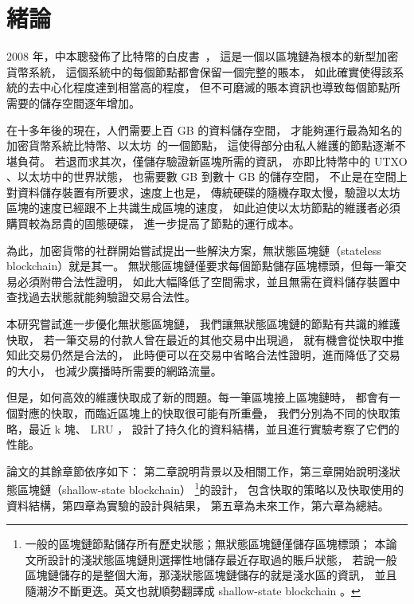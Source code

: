 \chapter{緒論}
\label{c:intro}

2008 年，中本聰發佈了比特幣的白皮書~\cite{nakamoto2019bitcoin}，
這是一個以區塊鏈為根本的新型加密貨幣系統，
這個系統中的每個節點都會保留一個完整的賬本，
如此確實使得該系統的去中心化程度達到相當高的程度，
但不可磨滅的賬本資訊也導致每個節點所需要的儲存空間逐年增加。

在十多年後的現在，人們需要上百 GB 的資料儲存空間，
才能夠運行最為知名的加密貨幣系統比特幣、以太坊~\cite{wood2014ethereum}的一個節點，
這使得部分由私人維護的節點逐漸不堪負荷。
若退而求其次，僅儲存驗證新區塊所需的資訊，
亦即比特幣中的 UTXO 、以太坊中的世界狀態，
也需要數 GB 到數十 GB 的儲存空間，
不止是在空間上對資料儲存裝置有所要求，速度上也是，
傳統硬碟的隨機存取太慢，驗證以太坊區塊的速度已經跟不上共識生成區塊的速度，
如此迫使以太坊節點的維護者必須購買較為昂貴的固態硬碟，
進一步提高了節點的運行成本。

為此，加密貨幣的社群開始嘗試提出一些解決方案，無狀態區塊鏈（stateless blockchain）就是其一。
無狀態區塊鏈僅要求每個節點儲存區塊標頭，但每一筆交易必須附帶合法性證明，
如此大幅降低了空間需求，並且無需在資料儲存裝置中查找過去狀態就能夠驗證交易合法性。

本研究嘗試進一步優化無狀態區塊鏈，
我們讓無狀態區塊鏈的節點有共識的維護快取，
若一筆交易的付款人曾在最近的其他交易中出現過，
就有機會從快取中推知此交易仍然是合法的，
此時便可以在交易中省略合法性證明，進而降低了交易的大小，
也減少廣播時所需要的網路流量。

但是，如何高效的維護快取成了新的問題。每一筆區塊接上區塊鏈時，
都會有一個對應的快取，而臨近區塊上的快取很可能有所重疊，
我們分別為不同的快取策略，最近 k 塊、 LRU ，
設計了持久化的資料結構，並且進行實驗考察了它們的性能。

論文的其餘章節依序如下：
第二章說明背景以及相關工作，第三章開始說明淺狀態區塊鏈（shallow-state blockchain）
\footnote{一般的區塊鏈節點儲存所有歷史狀態；無狀態區塊鏈僅儲存區塊標頭；
本論文所設計的淺狀態區塊鏈則選擇性地儲存最近存取過的賬戶狀態，
若說一般區塊鏈儲存的是整個大海，那淺狀態區塊鏈儲存的就是淺水區的資訊，
並且隨潮汐不斷更迭。英文也就順勢翻譯成 shallow-state blockchain 。}的設計，
包含快取的策略以及快取使用的資料結構，第四章為實驗的設計與結果，
第五章為未來工作，第六章為總結。